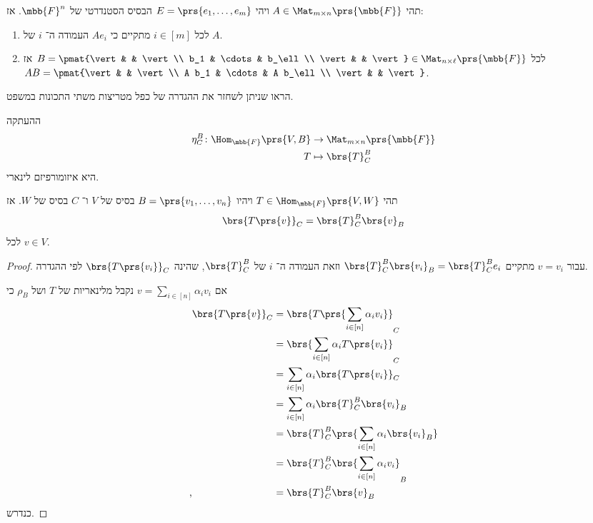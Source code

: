 \documentclass[a4paper,10pt,twoside,openany]{book}
\begin{document}
\begin{theorem}
תהי
$A \in \Mat_{m \times n}\prs{\mbb{F}}$
ויהי
$E = \prs{e_1, \ldots, e_m}$
הבסיס הסטנדרטי של
$\mbb{F}^n$.
אז:
\begin{enumerate}[label = (\roman*)]
\item
לכל
$i \in [m]$
מתקיים כי
$A e_i$
העמודה ה־%
$i$
של
$A$.
\item
לכל
$B = \pmat{\vert & & \vert \\ b_1 & \cdots & b_\ell \\ \vert & & \vert} \in \Mat_{n \times \ell}\prs{\mbb{F}}$
אז
$AB = \pmat{\vert & & \vert \\ A b_1 & \cdots & A b_\ell \\ \vert & & \vert}$.
\end{enumerate}
\end{theorem}

\begin{exercisechap}
הראו שניתן לשחזר את ההגדרה של כפל מטריצות משתי התכונות במשפט.
\end{exercisechap}

\begin{remark}
ההעתקה
\begin{align*}
\eta^B_C \colon \Hom_{\mbb{F}}\prs{V,B} &\to \Mat_{m \times n}\prs{\mbb{F}} \\
T &\mapsto \brs{T}^B_C
\end{align*}
היא איזומורפיזם לינארי.
\end{remark}

\begin{proposition}
תהי
$T \in \Hom_{\mbb{F}}\prs{V,W}$
ויהיו
$B = \prs{v_1, \ldots, v_n}$
בסיס של
$V$
ו־%
$C$
בסיס של
$W$.
אז
\[\brs{T\prs{v}}_C = \brs{T}^B_C \brs{v}_B\]
לכל
$v \in V$.
\end{proposition}

\pagebreak
\begin{proof}
עבור
$v = v_i$
מתקיים
$\brs{T}^B_C \brs{v_i}_B = \brs{T}^B_C e_i$
וזאת העמודה ה־%
$i$
של
$\brs{T}^B_C$,
שהינה
$\brs{T\prs{v_i}}_C$
לפי ההגדרה.

אם
$v = \sum_{i \in [n]} \alpha_i v_i$
נקבל מלינאריות של
$T$
ושל
$\rho_B$
כי
\begin{align*}
\brs{T\prs{v}}_C &= \brs{T\prs{\sum_{i \in [n]} \alpha_i v_i}}_C
\\&= \brs{\sum_{i \in [n]} \alpha_i T\prs{v_i}}_C
\\&= \sum_{i \in [n]} \alpha_i \brs{T\prs{v_i}}_C
\\&= \sum_{i \in [n]} \alpha_i \brs{T}^B_C \brs{v_i}_B
\\&= \brs{T}^B_C \prs{\sum_{i \in [n]} \alpha_i \brs{v_i}_B}
\\&= \brs{T}^B_C \brs{\sum_{i \in [n]} \alpha_i v_i}_B
\\\text{,} \hphantom{\brs{T\prs{v}}_C} &= \brs{T}^B_C \brs{v}_B
\end{align*}
כנדרש.
\end{proof}
\end{document}
